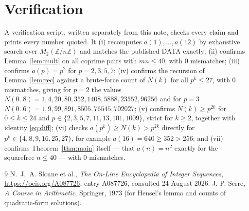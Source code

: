 \documentclass[11pt,a4paper]{article}
\theoremstyle{plain}
\theoremstyle{definition}
\begin{document}
\section{Verification}

A verification script, written separately from this note, checks every claim and prints
every number quoted. It (i) recomputes $a(1),\dots,a(12)$ by exhaustive search over
$M_{2}(\mathbb{Z}/n\mathbb{Z})$ and matches the published DATA exactly; (ii) confirms
Lemma~\ref{lem:mult} on all coprime pairs with $mn\le40$, with 0 mismatches; (iii) confirms
$a(p)=p^{2}$ for $p=2,3,5,7$; (iv) confirms the recursion of Lemma~\ref{lem:rec} against a
brute-force count of $N(k)$ for all $p^{k}\le27$, with 0 mismatches, giving for $p=2$ the
values $N(0..8)=1,4,20,80,352,1408,5888,23552,96256$ and for $p=3$
$N(0..6)=1,9,99,891,8505,76545,702027$; (v) confirms $N(k)\ge p^{2k}$ for $0\le k\le24$ and
$p\in\{2,3,5,7,11,13,101,1009\}$, strict for $k\ge2$, together with identity
\eqref{eq:diff}; (vi) checks $a(p^{k})\ge N(k)>p^{2k}$ directly for
$p^{k}\in\{4,8,9,16,25,27\}$, for example $a(16)=640\ge352>256$; and (vii) confirms
Theorem~\ref{thm:main} itself --- that $a(n)=n^{2}$ exactly for the squarefree $n\le40$ ---
with 0 mismatches.

\begin{thebibliography}{9}
 N.~J.~A. Sloane et al., \emph{The On-Line Encyclopedia of Integer
Sequences}, \url{https://oeis.org/A087726}, entry A087726, consulted 24 August 2026.
 J.-P. Serre, \emph{A Course in Arithmetic}, Springer, 1973 (for Hensel's
lemma and counts of quadratic-form solutions).
\end{thebibliography}
\end{document}
